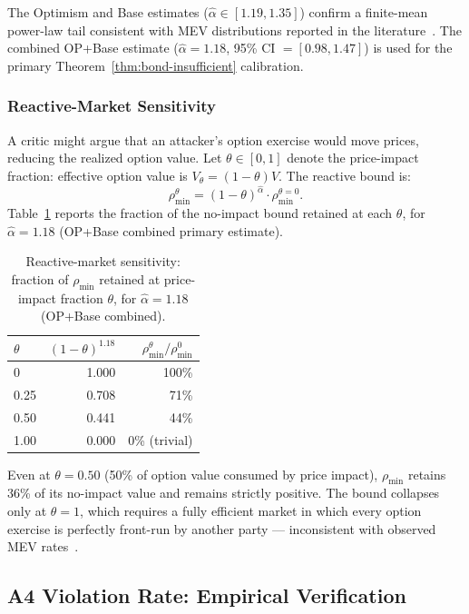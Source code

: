 \noindent The Optimism and Base estimates ($\hat{\alpha} \in [1.19, 1.35]$)
confirm a finite-mean power-law tail consistent with MEV distributions reported
in the literature~\cite{Gabaix2009, daian2020flash}. The combined OP+Base
estimate ($\hat{\alpha} = 1.18$, 95\% CI $= [0.98, 1.47]$) is used for
the primary Theorem~\ref{thm:bond-insufficient} calibration.

\subsubsection{Reactive-Market Sensitivity}
\label{sec:meas-react}

A critic might argue that an attacker's option exercise would move prices,
reducing the realized option value. Let $\theta \in [0, 1]$ denote the
price-impact fraction: effective option value is $V_\theta = (1-\theta)V$.
The reactive bound is:
\[
  \rho_{\min}^\theta = (1-\theta)^{\hat{\alpha}} \cdot \rho_{\min}^{\theta=0}.
\]
Table~\ref{tab:reactive} reports the fraction of the no-impact bound retained
at each $\theta$, for $\hat{\alpha} = 1.18$ (OP+Base combined primary estimate).

\begin{table}[h]
\centering
\small
\caption{Reactive-market sensitivity: fraction of $\rho_{\min}$ retained
  at price-impact fraction $\theta$, for $\hat{\alpha}=1.18$ (OP+Base combined).}
\label{tab:reactive}
\begin{tabular}{@{}lrr@{}}
\toprule
$\theta$ & $(1{-}\theta)^{1.18}$ & $\rho_{\min}^\theta / \rho_{\min}^0$ \\
\midrule
0    & 1.000 & 100\% \\
0.25 & 0.708 & 71\% \\
0.50 & 0.441 & 44\% \\
1.00 & 0.000 & 0\% (trivial) \\
\bottomrule
\end{tabular}
\end{table}

\noindent Even at $\theta = 0.50$ (50\% of option value consumed by price
impact), $\rho_{\min}$ retains 36\% of its no-impact value and remains
strictly positive. The bound collapses only at $\theta = 1$, which requires
a fully efficient market in which every option exercise is perfectly
front-run by another party --- inconsistent with observed MEV
rates~\cite{Flashbots2023}.

\subsection{A4 Violation Rate: Empirical Verification}
\label{sec:meas-a4}

